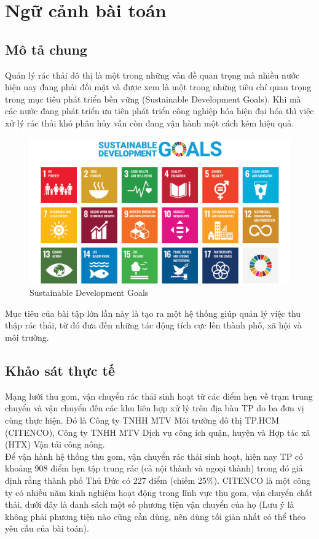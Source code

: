 \section{Ngữ cảnh bài toán}
    \subsection{Mô tả chung}
        \quad Quản lý rác thải đô thị là một trong những vấn đề quan trọng mà nhiều nước hiện nay đang phải đối mặt và được xem là một trong những tiêu chí quan trọng trong mục tiêu phát triển bền vững (Sustainable Development Goals). Khi mà các nước đang phát triển ưu tiên phát triển công nghiệp hóa hiện đại hóa thì việc xử lý rác thải khó phân hủy vẫn còn đang vận hành một cách kém hiệu quả.\\
        
        \begin{figure}[h]
            \centering
            \includegraphics[width=1\linewidth]{imgs/SDG.jpg}
            \caption{Sustainable Development Goals}
        \end{figure}
        
        \quad Mục tiêu của bài tập lớn lần này là tạo ra một hệ thống giúp quản lý việc thu thập rác thải, từ đó đưa đến những tác động tích cực lên thành phố, xã hội và môi trường.
    \subsection{Khảo sát thực tế}
        \quad Mạng lưới thu gom, vận chuyển rác thải sinh hoạt từ các điểm hẹn về trạm trung chuyển và vận chuyển đến các khu liên hợp xử lý trên địa bàn TP do ba đơn vị cùng thực hiện. Đó là Công ty TNHH MTV Môi trường đô thị TP.HCM (CITENCO), Công ty TNHH MTV Dịch vụ công ích quận, huyện và Hợp tác xã (HTX) Vận tải công nông. \\
        \quad Để vận hành hệ thống thu gom, vận chuyển rác thải sinh hoạt, hiện nay TP có khoảng 908 điểm hẹn tập trung rác (cả nội thành và ngoại thành) trong đó giả định rằng thành phố Thủ Đức có 227 điểm (chiếm 25\%). CITENCO là một công ty có nhiều năm kinh nghiệm hoạt động trong lĩnh vực thu gom, vận chuyển chất thải, dưới đây là danh sách một số phương tiện vận chuyển của họ (Lưu ý là không phải phương tiện nào cũng cần dùng, nên dùng tối giản nhất có thể theo yêu cầu của bài toán).
        
